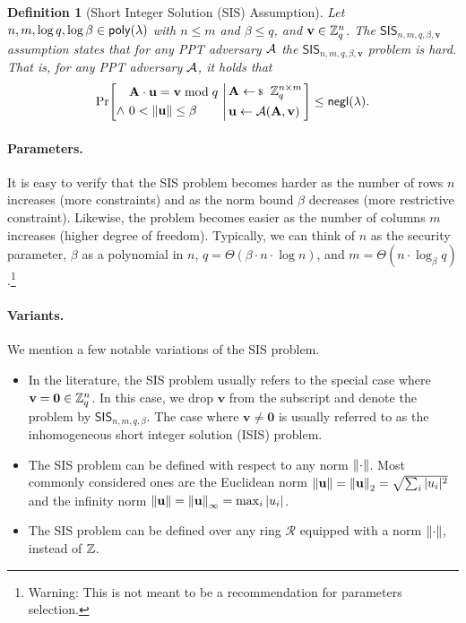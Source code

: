 \documentclass[10pt,twoside]{article}
\newtheorem{definition}[theorem]{Definition}
\renewcommand{\vec}[1]{\mathbf{#1}}
\newcommand{\mat}[1]{\mathbf{#1}}
\newcommand{\SIS}{\mathsf{SIS}}
\newcommand{\ring}{\mathcal{R}}
\begin{document}
\begin{definition}[Short Integer Solution (SIS) Assumption]
    Let $n, m, \log q, \log \beta \in \poly$ with $n \leq m$ and $\beta \leq q$, and $\vec{v} \in \ZZ_q^n$.
    The $\SIS_{n,m,q,\beta,\vec{v}}$ assumption states that for any PPT adversary $\mathcal{A}$ the $\SIS_{n,m,q,\beta,\vec{v}}$ problem is hard.
    That is, for any PPT adversary $\mathcal{A}$, it holds that
    \[
        \condprob{
        \begin{aligned}
            &\mat{A} \cdot \vec{u} = \vec{v} \bmod q \\
            \land~&0 < \norm{\vec{u}} \leq \beta \\
        \end{aligned}
        }
        {
            \begin{aligned}
                &\mat{A} \sample \ZZ_q^{n \times m} \\
                &\vec{u} \gets \adv(\mat{A},\vec{v}) \\
            \end{aligned}
        }
        \leq \negl.
    \]
\end{definition}

\paragraph{Parameters.}
It is easy to verify that the SIS problem becomes harder as the number of rows $n$ increases (more constraints) and as the norm bound $\beta$ decreases (more restrictive constraint).
Likewise, the problem becomes easier as the number of columns $m$ increases (higher degree of freedom).
Typically, we can think of $n$ as the security parameter, $\beta$ as a polynomial in $n$, $q = \Theta(\beta \cdot n \cdot \log n)$, and $m = \Theta(n \cdot \log_\beta q)$.\footnote{Warning: This is not meant to be a recommendation for parameters selection.}

\paragraph{Variants.}
We mention a few notable variations of the SIS problem.
\begin{itemize}
    \item In the literature, the SIS problem usually refers to the special case where $\vec{v} = \vec{0} \in \ZZ_q^n$.
    In this case, we drop $\vec{v}$ from the subscript and denote the problem by $\SIS_{n,m,q,\beta}$.
    The case where $\vec{v} \neq \vec{0}$ is usually referred to as the inhomogeneous short integer solution (ISIS) problem.
    \item The SIS problem can be defined with respect to any norm $\left\lVert\cdot\right\rVert$. Most commonly considered ones are the Euclidean norm $\norm{\vec{u}} = \norm{\vec{u}}_2 = \sqrt{\sum_i |u_i|^2}$ and the infinity norm $\norm{\vec{u}} = \norm{\vec{u}}_\infty = \max_i |u_i|$.
    \item The SIS problem can be defined over any ring $\ring$ equipped with a norm $\left\lVert\cdot\right\rVert$, instead of $\mathbb{Z}$.
\end{itemize}
\end{document}
